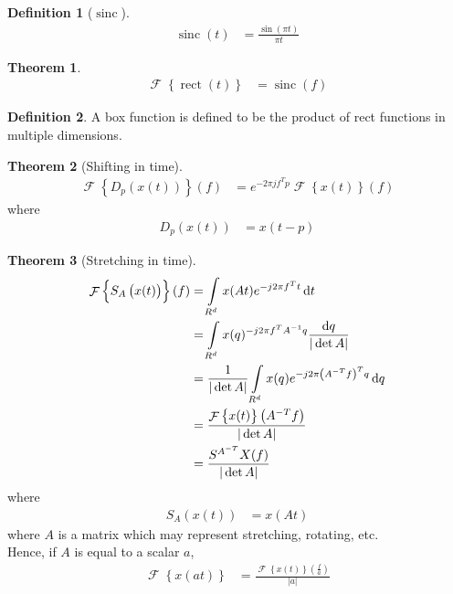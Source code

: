 \documentclass[titlepage, fleqn, a4paper, 12pt, twoside]{article}
\theoremstyle{definition}
\newtheorem{definition}{Definition}
\theoremstyle{theorem}
\newtheorem{theorem}{Theorem}
\DeclareMathOperator{\FT}{\mathcal{F}}
\DeclareMathOperator{\rect}{\mathrm{rect}}
\DeclareMathOperator{\sinc}{\mathrm{sinc}}
\begin{document}
\begin{definition}[$\sinc$]
	\begin{align*}
		\sinc(t) &= \frac{\sin(\pi t)}{\pi t}
	\end{align*}
\end{definition}

\begin{theorem}
	\begin{align*}
		\FT\left\{ \rect(t) \right\} &= \sinc(f)
	\end{align*}
\end{theorem}

\begin{definition}
	A box function is defined to be the product of rect functions in multiple dimensions.
\end{definition}

\begin{theorem}[Shifting in time]
	\begin{align*}
		\FT\left\{ D_p\left( x(t) \right) \right\}(f) &= e^{-2 \pi j f^T p} \FT\left\{ x(t) \right\}(f)
	\end{align*}
	where
	\begin{align*}
		D_p\left( x(t) \right) &= x(t - p)
	\end{align*}
	\label{thm:shifting_in_time}
\end{theorem}

\begin{theorem}[Stretching in time]
	\begin{align*}
		\FT\left\{ S_A\left( x(t) \right) \right\}(f) &= \int\limits_{R^d} x(A t) e^{-j 2 \pi f^T t} \dif t\\
		&= \int\limits_{R^d} x(q) ^{-j 2 \pi f^T A^{-1} q} \frac{\dif q}{|\det A|}\\
		&= \frac{1}{|\det A|} \int\limits_{R^d}  x(q) e^{-j 2 \pi \left( A^{-T} f \right)^T q} \dif q\\
		&= \frac{\FT\left\{ x(t) \right\}\left( A^{-T} f \right)}{|\det A|}\\
		&= \frac{S^{A^{-T}} X(f)}{|\det A|}
	\end{align*}
	where
	\begin{align*}
		S_A\left( x(t) \right) &= x(A t)
	\end{align*}
	where $A$ is a matrix which may represent stretching, rotating, etc.\\
	Hence, if $A$ is equal to a scalar $a$,
	\begin{align*}
		\FT\left\{ x(a t) \right\} &= \frac{\FT\left\{ x(t) \right\}\left( \frac{f}{a} \right)}{|a|}
	\end{align*}
	\label{thm:stretching_in_time}
\end{theorem}
\end{document}
